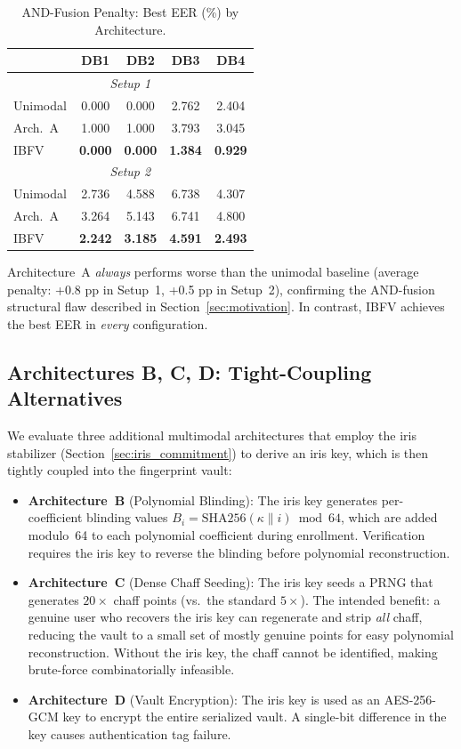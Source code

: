 \documentclass[3p,twocolumn]{elsarticle}
\newcommand{\IBFV}{\textsf{IBFV}}
\begin{document}
\begin{table}[t]
\centering
\caption{AND-Fusion Penalty: Best EER (\%) by Architecture.}
\label{tab:arch_a_penalty}
\begin{tabular}{@{}l c c c c@{}}
\toprule
 & \textbf{DB1} & \textbf{DB2} & \textbf{DB3} & \textbf{DB4} \\
\midrule
\multicolumn{5}{c}{\textit{Setup 1}} \\
\midrule
Unimodal & 0.000 & 0.000 & 2.762 & 2.404 \\
Arch.~A  & 1.000 & 1.000 & 3.793 & 3.045 \\
\IBFV{}  & \textbf{0.000} & \textbf{0.000} & \textbf{1.384} & \textbf{0.929} \\
\midrule
\multicolumn{5}{c}{\textit{Setup 2}} \\
\midrule
Unimodal & 2.736 & 4.588 & 6.738 & 4.307 \\
Arch.~A  & 3.264 & 5.143 & 6.741 & 4.800 \\
\IBFV{}  & \textbf{2.242} & \textbf{3.185} & \textbf{4.591} & \textbf{2.493} \\
\bottomrule
\end{tabular}
\end{table}

Architecture~A \emph{always} performs worse than the unimodal baseline (average penalty: +0.8 pp in Setup~1, +0.5 pp in Setup~2), confirming the AND-fusion structural flaw described in Section~\ref{sec:motivation}. In contrast, \IBFV{} achieves the best EER in \emph{every} configuration.

\subsection{Architectures B, C, D: Tight-Coupling Alternatives}
\label{sec:arch_bcd_results}

We evaluate three additional multimodal architectures that employ the iris stabilizer (Section~\ref{sec:iris_commitment}) to derive an iris key, which is then tightly coupled into the fingerprint vault:

\begin{itemize}
    \item \textbf{Architecture~B} (Polynomial Blinding): The iris key generates per-coefficient blinding values $B_i = \text{SHA256}(\kappa \| i) \bmod 64$, which are added modulo~64 to each polynomial coefficient during enrollment. Verification requires the iris key to reverse the blinding before polynomial reconstruction.
    \item \textbf{Architecture~C} (Dense Chaff Seeding): The iris key seeds a PRNG that generates $20\times$ chaff points (vs.\ the standard $5\times$). The intended benefit: a genuine user who recovers the iris key can regenerate and strip \emph{all} chaff, reducing the vault to a small set of mostly genuine points for easy polynomial reconstruction. Without the iris key, the chaff cannot be identified, making brute-force combinatorially infeasible.
    \item \textbf{Architecture~D} (Vault Encryption): The iris key is used as an AES-256-GCM key to encrypt the entire serialized vault. A single-bit difference in the key causes authentication tag failure.
\end{itemize}
\end{document}
